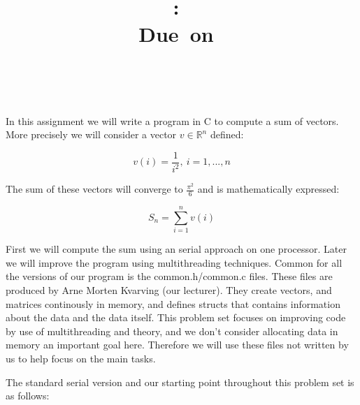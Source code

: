 \documentclass{article}
\title{
\vspace{2in}
\textmd{\textbf{\hmwkClass:\ \hmwkTitle}}\\
\normalsize\vspace{0.1in}\small{Due\ on\ \hmwkDueDate}\\
\vspace{0.1in}\large{\textit{\hmwkClassInstructor\ \hmwkClassTime}}
\vspace{3in}
}
\author{\textbf{\hmwkAuthorName}}
\date{} %
\begin{document}
\maketitle



 \newpage



\section{}
	
	In this assignment we will write a program in C to compute a sum of vectors. More precisely we will consider a vector $ v \in \mathbb{R}^n $ defined:
    
	$$ v(i) = \frac{1}{i^2}, \ i=1,...,n$$
    
	The sum of these vectors will converge to $ \frac{\pi^2}{6} $ and is mathematically expressed:
    
	$$ S_n = \sum\limits_{i=1}^n v(i) $$ 
    
	First we will compute the sum using an serial approach on one processor. Later we will improve the program using multithreading techniques. Common for all the versions of our program is the common.h/common.c files. These files are produced by Arne Morten Kvarving (our lecturer). They create vectors, and matrices continously in memory, and defines structs that contains information about the data and the data itself. This problem set focuses on improving code by use of multithreading and theory, and we don't consider allocating data in memory an important goal here. Therefore we will use these files not written by us to help focus on the main tasks.
    
    
	The standard serial version and our starting point throughout this problem set is as follows:
	
    
\end{document}

